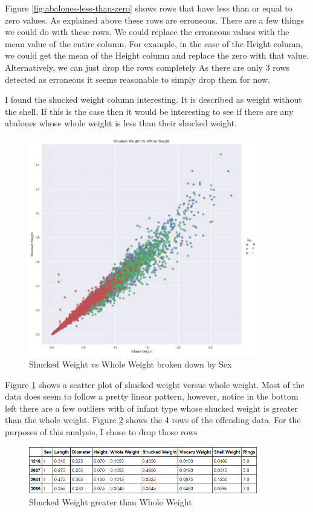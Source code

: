 Figure \ref{fig:abalones-less-than-zero} shows rows that have less than or equal to zero values. As explained above these rows are erroneous. There are a few things we could do with these rows. We could replace the erroneous values with the mean value of the entire column. For example, in the case of the Height column, we could get the mean of the Height column and replace the zero with that value. Alternatively, we can just drop the rows completely As there are only 3 rows detected as erroneous it seems reasonable to simply drop them for now.

I found the shucked weight column interesting. It is described as weight without the shell. If this is the case then it would be interesting to see if there are any abalones whose whole weight is less than their shucked weight.

\begin{figure}[H]
  \centering
  \includegraphics[scale=0.5,width=100mm]{./images/abalone-shucked-weight-vs-whole.png}
  \caption{Shucked Weight vs Whole Weight broken down by Sex}
  \label{fig:shucked-vs-whole}
\end{figure}

Figure \ref{fig:shucked-vs-whole} shows a scatter plot of shucked weight versus whole weight. Most of the data does seem to follow a pretty linear pattern, however, notice in the bottom left there are a few outliers with of infant type whose shucked weight is greater than the whole weight. Figure \ref{fig:shucked-greater-than-whole} shows the 4 rows of the offending data. For the purposes of this analysis, I chose to drop those rows

\begin{figure}[H]
  \centering
  \includegraphics[scale=0.5,width=100mm]{./images/abalone-shucked-greater-than-whole.png}
  \caption{Shucked Weight greater than Whole Weight}
  \label{fig:shucked-greater-than-whole}
\end{figure}

